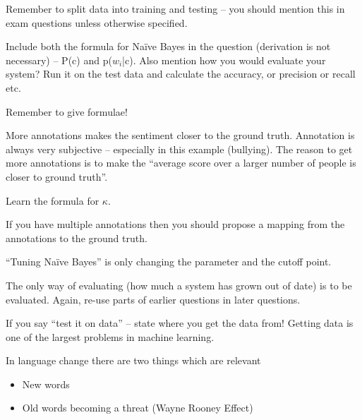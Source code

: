 \documentclass[10pt,\jkfside,a4paper]{article}
\begin{document}
Remember to split data into training and testing -- you should mention this in exam questions unless 
otherwise specified.

Include both the formula for Na\"ive Bayes in the question (derivation is not necessary) -- 
P(c) and p($w_i$|c). Also mention how you would evaluate your system? Run it on the test data 
and calculate the accuracy, or precision or recall etc.

Remember to give formulae!

More annotations makes the sentiment closer to the ground truth. Annotation is always very subjective -- 
especially in this example (bullying). The reason to get more annotations is to make 
the ``average score over a larger number of people is closer to ground truth''.

Learn the formula for $\kappa$.

If you have multiple annotations then you should propose a mapping from the annotations to the ground 
truth.

``Tuning Na\"ive Bayes'' is only changing the parameter and the cutoff point.

The only way of evaluating (how much a system has grown out of date) is to be evaluated. 
Again, re-use parts of earlier questions in later questions.

If you say ``test it on data'' -- state where you get the data from! Getting data is one of the largest 
problems in machine learning.

In language change there are two things which are relevant 
\begin{itemize}

\item New words

\item Old words becoming a threat (Wayne Rooney Effect)

\end{itemize}
\end{document}
